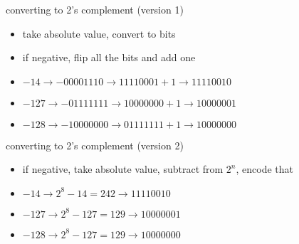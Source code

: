 \begin{frame}{converting to 2's complement (version 1)}
\begin{itemize}
\item take absolute value, convert to bits
\item if negative, flip all the bits and add one
\vspace{.5cm}
\item $-14 \rightarrow -00001110 \rightarrow 11110001 + 1 \rightarrow  11110010$
\item $-127 \rightarrow -01111111 \rightarrow 10000000 + 1 \rightarrow 10000001$
\item $-128 \rightarrow -10000000 \rightarrow 01111111 + 1 \rightarrow 10000000$
\end{itemize}
\end{frame}

\begin{frame}{converting to 2's complement (version 2)}
\begin{itemize}
\item if negative, take absolute value, subtract from $2^n$, encode that
\item $-14 \rightarrow 2^8 - 14 = 242 \rightarrow 11110010$
\item $-127 \rightarrow 2^8 - 127 = 129 \rightarrow 10000001$
\item $-128 \rightarrow 2^8 - 127 = 129 \rightarrow 10000000$
\end{itemize}
\end{frame}



